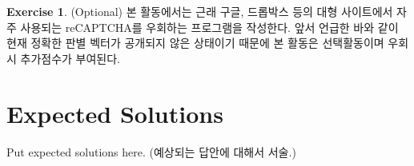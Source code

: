 \documentclass[a4paper, 11pt]{article}
\theoremstyle{definition}
\newtheorem{exercise}{Exercise}
\begin{document}
\begin{exercise} (Optional)
본 활동에서는 근래 구글, 드롭박스 등의 대형 사이트에서 자주 사용되는 reCAPTCHA를 우회하는 프로그램을 작성한다. 앞서 언급한 바와 같이 현재 정확한 판별 벡터가 공개되지 않은 상태이기 때문에 본 활동은 선택활동이며 우회시 추가점수가 부여된다.
\end{exercise}

\section{Expected Solutions}

Put expected solutions here.
(예상되는 답안에 대해서 서술.)



\end{document}
